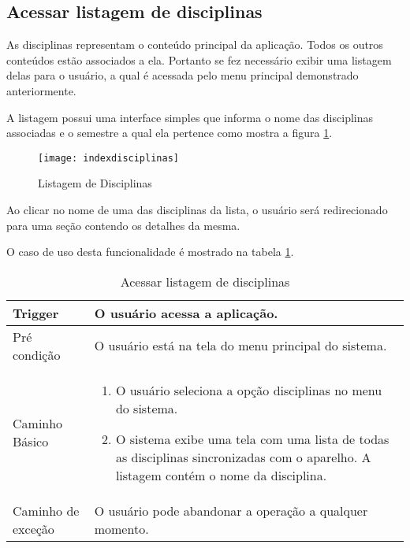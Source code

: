 \subsection{Acessar listagem de disciplinas}

As disciplinas representam o conteúdo principal da aplicação. Todos os outros conteúdos estão associados a ela. Portanto se fez necessário exibir uma listagem delas para o usuário, a qual é acessada pelo menu principal demonstrado anteriormente.

A listagem possui uma interface simples que informa o nome das disciplinas associadas e o semestre a qual ela pertence como mostra a figura \ref{indexdisciplinas}.

\begin{figure}[H]
    \centering
\texttt{[image: indexdisciplinas]}
    \caption{Listagem de Disciplinas}
    \label{indexdisciplinas}
\end{figure}

Ao clicar no nome de uma das disciplinas da lista, o usuário será redirecionado para uma seção contendo os detalhes da mesma.

O caso de uso desta funcionalidade é mostrado na tabela \ref{table:indexdisciplinas}.

\begin{table}[H]

  \begin{tabular}{ p{} | p{} }
    Trigger & O usuário acessa a aplicação.\\
    \hline
    Pré condição & O usuário está na tela do menu principal do sistema.\\
    \hline
    Caminho Básico &
    \begin{minipage}{5in}
      \vskip 4pt
      \begin{enumerate}
        \item O usuário seleciona a opção disciplinas no menu do sistema.
        \item O sistema exibe uma tela com uma lista de todas as disciplinas sincronizadas com o aparelho. A listagem contém o nome da disciplina.
      \end{enumerate}
      \vskip 4pt
    \end{minipage} \\
    \hline
    Caminho de exceção & O usuário pode abandonar a operação a qualquer momento.
 \end{tabular}
 \caption{Acessar listagem de disciplinas}
 \label{table:indexdisciplinas}
\end{table}

